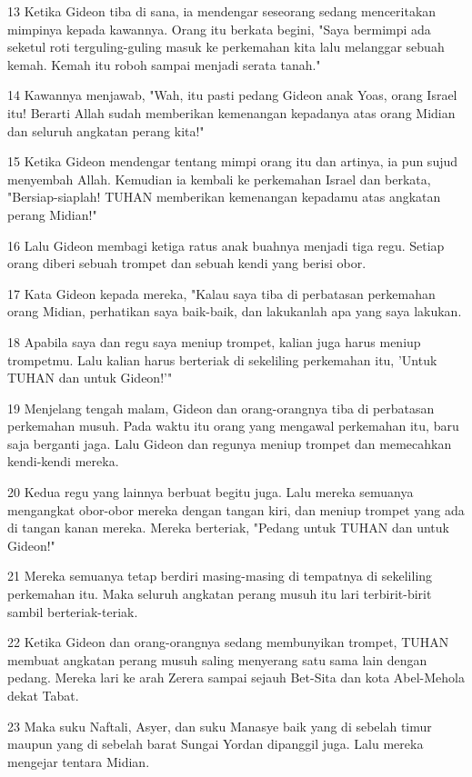 \par 13 Ketika Gideon tiba di sana, ia mendengar seseorang sedang menceritakan mimpinya kepada kawannya. Orang itu berkata begini, "Saya bermimpi ada seketul roti terguling-guling masuk ke perkemahan kita lalu melanggar sebuah kemah. Kemah itu roboh sampai menjadi serata tanah."
\par 14 Kawannya menjawab, "Wah, itu pasti pedang Gideon anak Yoas, orang Israel itu! Berarti Allah sudah memberikan kemenangan kepadanya atas orang Midian dan seluruh angkatan perang kita!"
\par 15 Ketika Gideon mendengar tentang mimpi orang itu dan artinya, ia pun sujud menyembah Allah. Kemudian ia kembali ke perkemahan Israel dan berkata, "Bersiap-siaplah! TUHAN memberikan kemenangan kepadamu atas angkatan perang Midian!"
\par 16 Lalu Gideon membagi ketiga ratus anak buahnya menjadi tiga regu. Setiap orang diberi sebuah trompet dan sebuah kendi yang berisi obor.
\par 17 Kata Gideon kepada mereka, "Kalau saya tiba di perbatasan perkemahan orang Midian, perhatikan saya baik-baik, dan lakukanlah apa yang saya lakukan.
\par 18 Apabila saya dan regu saya meniup trompet, kalian juga harus meniup trompetmu. Lalu kalian harus berteriak di sekeliling perkemahan itu, 'Untuk TUHAN dan untuk Gideon!'"
\par 19 Menjelang tengah malam, Gideon dan orang-orangnya tiba di perbatasan perkemahan musuh. Pada waktu itu orang yang mengawal perkemahan itu, baru saja berganti jaga. Lalu Gideon dan regunya meniup trompet dan memecahkan kendi-kendi mereka.
\par 20 Kedua regu yang lainnya berbuat begitu juga. Lalu mereka semuanya mengangkat obor-obor mereka dengan tangan kiri, dan meniup trompet yang ada di tangan kanan mereka. Mereka berteriak, "Pedang untuk TUHAN dan untuk Gideon!"
\par 21 Mereka semuanya tetap berdiri masing-masing di tempatnya di sekeliling perkemahan itu. Maka seluruh angkatan perang musuh itu lari terbirit-birit sambil berteriak-teriak.
\par 22 Ketika Gideon dan orang-orangnya sedang membunyikan trompet, TUHAN membuat angkatan perang musuh saling menyerang satu sama lain dengan pedang. Mereka lari ke arah Zerera sampai sejauh Bet-Sita dan kota Abel-Mehola dekat Tabat.
\par 23 Maka suku Naftali, Asyer, dan suku Manasye baik yang di sebelah timur maupun yang di sebelah barat Sungai Yordan dipanggil juga. Lalu mereka mengejar tentara Midian.
